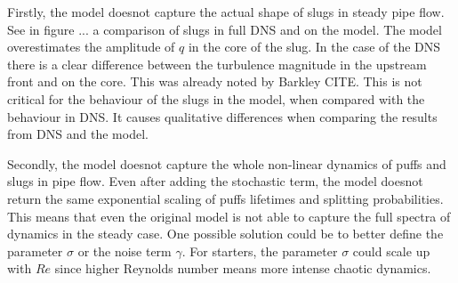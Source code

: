 \documentclass{article}
\begin{document}
Firstly, the model doesnot capture the actual shape of slugs in steady pipe flow. See in figure ... a comparison of slugs in full DNS and on the model. The model overestimates the amplitude of $q$ in the core of the slug. In the case of the DNS there is a clear difference between the turbulence magnitude in the upstream front and on the core. This was already noted by Barkley CITE. This is not critical for the behaviour of the slugs in the model, when compared with the behaviour in DNS. It causes qualitative differences when comparing the results from DNS and the model. 

Secondly, the model doesnot capture the whole non-linear dynamics of puffs and slugs in pipe flow. Even after adding the stochastic term, the model doesnot return the same exponential scaling of puffs lifetimes and splitting probabilities. This means that even the original model is not able to capture the full spectra of dynamics in the steady case. One possible solution could be to better define the parameter $\sigma$ or the noise term $\gamma$. For starters, the parameter $\sigma$ could scale up with $Re$ since higher Reynolds number means more intense chaotic dynamics.










\end{document}

